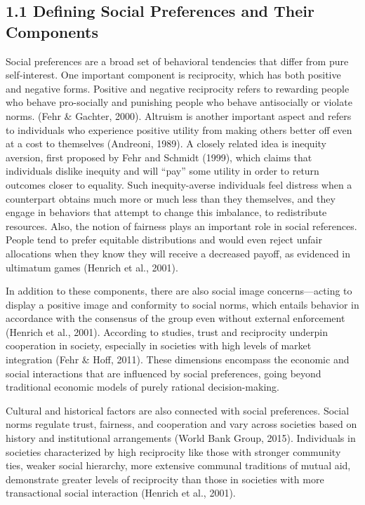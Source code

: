 \documentclass[14pt]{article}
\theoremstyle{remark}
\begin{document}
\subsection{1.1 Defining Social Preferences and Their Components}

Social preferences are a broad set of behavioral tendencies that differ from pure self-interest. One important component is reciprocity, which has both positive and negative forms. Positive and negative reciprocity refers to rewarding people who behave pro-socially and punishing people who behave antisocially or violate norms. (Fehr \& Gachter, 2000). Altruism is another important aspect and refers to individuals who experience positive utility from making others better off even at a cost to themselves (Andreoni, 1989). A closely related idea is inequity aversion, first proposed by Fehr and Schmidt (1999), which claims that individuals dislike inequity and will ``pay'' some utility in order to return outcomes closer to equality. Such inequity-averse individuals feel distress when a counterpart obtains much more or much less than they themselves, and they engage in behaviors that attempt to change this imbalance, to redistribute resources. Also, the notion of fairness plays an important role in social references. People tend to prefer equitable distributions and would even reject unfair allocations when they know they will receive a decreased payoff, as evidenced in ultimatum games (Henrich et al., 2001).

In addition to these components, there are also social image concerns---acting to display a positive image and conformity to social norms, which entails behavior in accordance with the consensus of the group even without external enforcement (Henrich et al., 2001). According to studies, trust and reciprocity underpin cooperation in society, especially in societies with high levels of market integration (Fehr \& Hoff, 2011). These dimensions encompass the economic and social interactions that are influenced by social preferences, going beyond traditional economic models of purely rational decision-making.

Cultural and historical factors are also connected with social preferences. Social norms regulate trust, fairness, and cooperation and vary across societies based on history and institutional arrangements (World Bank Group, 2015). Individuals in societies characterized by high reciprocity like those with stronger community ties, weaker social hierarchy, more extensive communal traditions of mutual aid, demonstrate greater levels of reciprocity than those in societies with more transactional social interaction (Henrich et al., 2001).
\end{document}

